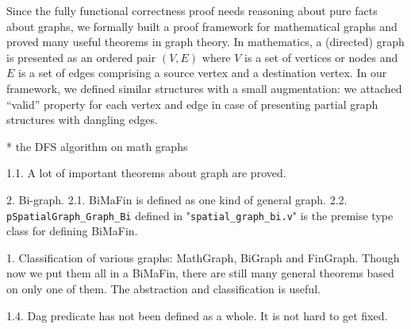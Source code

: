 Since the fully functional correctness proof needs reasoning about
pure facts about graphs, we formally built a proof framework for
mathematical graphs and proved many useful theorems in graph
theory. In mathematics, a (directed) graph is presented as an ordered
pair $(V, E)$ where $V$ is a set of vertices or nodes and $E$ is a set
of edges comprising a source vertex and a destination vertex. In our
framework, we defined similar structures with a small augmentation: we
attached ``valid'' property for each vertex and edge in case of
presenting partial graph structures with dangling edges.



* the DFS algorithm on math graphs

1.1. A lot of important theorems about graph are proved.

2. Bi-graph.
2.1. BiMaFin is defined as one kind of general graph.
2.2. \texttt{pSpatialGraph\_Graph\_Bi} defined in "\texttt{spatial\_graph\_bi.v}" is the premise type class for defining BiMaFin.

1. Classification of various graphs: MathGraph, BiGraph and FinGraph. Though now we put them all in a BiMaFin, there are still many general theorems based on only one of them. The abstraction and classification is useful.

1.4. Dag predicate has not been defined as a whole. It is not hard to get fixed.
